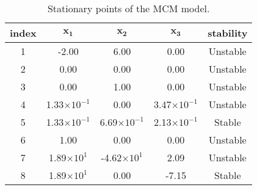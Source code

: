 \begin{table}[H]
	\begin{center}
		\begin{tabular}{c|c|c|c|c}
			\textbf{index} & $\mathbf{x_1}$ & $\mathbf{x_2}$ & $\mathbf{x_3}$ & \textbf{stability} \\
			\hline
			1 & -2.00 & 6.00 & 0.00 & Unstable \\
			2 & 0.00 & 0.00 & 0.00 & Unstable \\
			3 & 0.00 & 1.00 & 0.00 & Unstable \\
			4 & 1.33$\times 10^{-1}$ & 0.00 & 3.47$\times 10^{-1}$ & Unstable \\
			5 & 1.33$\times 10^{-1}$ & 6.69$\times 10^{-1}$ & 2.13$\times 10^{-1}$ & Stable \\
			6 & 1.00 & 0.00 & 0.00 & Unstable \\
			7 & 1.89$\times 10^{1}$ & -4.62$\times 10^{1}$ & 2.09 & Unstable \\
			8 & 1.89$\times 10^{1}$ & 0.00 & -7.15 & Stable \\
		\end{tabular}
	\end{center}
	\caption{Stationary points of the MCM model.}
	\label{tab:mcm_stationary_points}
\end{table}